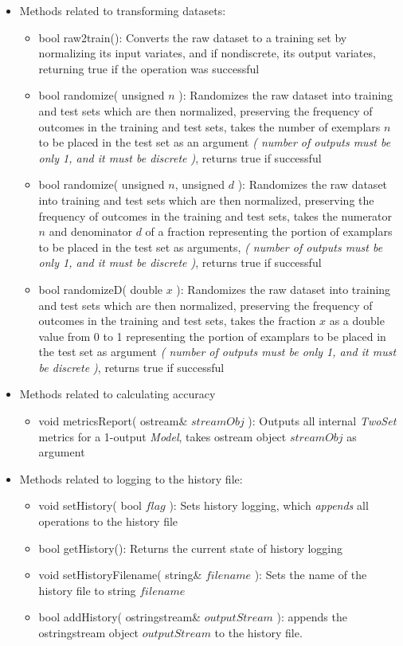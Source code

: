 \documentclass{report}
\def\beginred{\color{red}}
\def\endcolor{\color{black}}
\begin{document}
\begin{itemize}
\begin{itemize}
\item Methods related to transforming datasets:
\begin{itemize}
\item bool raw2train(): Converts the raw dataset to a training set by
      normalizing its input variates, and if nondiscrete, its output
      variates, returning true if the operation was successful
\item bool randomize( unsigned $n$ ): Randomizes the raw dataset into
      training and test sets which are then normalized, preserving the
      frequency of outcomes in the training and test sets, takes the
      number of exemplars $n$ to be placed in the test set as an
      argument {\em ( number of outputs must be only 1, and it must be
      discrete )}, returns true if successful
\item bool randomize( unsigned $n$, unsigned $d$ ): Randomizes the raw
      dataset into training and test sets which are then normalized,
      preserving the frequency of outcomes in the training and test
      sets, takes the numerator $n$ and denominator $d$ of a fraction
      representing the portion of examplars to be placed in the test
      set as arguments, {\em ( number of outputs must be only 1, and
      it must be discrete )}, returns true if successful
\item bool randomizeD( double $x$ ): Randomizes the raw dataset into
      training and test sets which are then normalized, preserving the
      frequency of outcomes in the training and test sets, takes the
      fraction $x$ as a double value from 0 to 1 representing the
      portion of examplars to be placed in the test set as argument
      {\em ( number of outputs must be only 1, and it must be discrete
      )}, returns true if successful
\end{itemize}

\item Methods related to calculating accuracy
\begin{itemize}
\item \beginred void metricsReport( ostream\& $streamObj$ ): Outputs
      all internal {\em TwoSet} metrics for a 1-output {\em Model},
      takes ostream object $streamObj$ as argument \endcolor
\end{itemize}

\item Methods related to logging to the history file:
\begin{itemize}
\item void setHistory( bool $flag$ ): Sets history logging, which {\em
      appends} all operations to the history file
\item bool getHistory(): Returns the current state of history logging
\item void setHistoryFilename( string\& $filename$ ): Sets the name of
      the history file to string $filename$
\item bool addHistory( ostringstream\& $outputStream$ ): appends the
      ostringstream object $outputStream$ to the history file.
\end{itemize}


\end{itemize}
\end{itemize}
\end{document}
